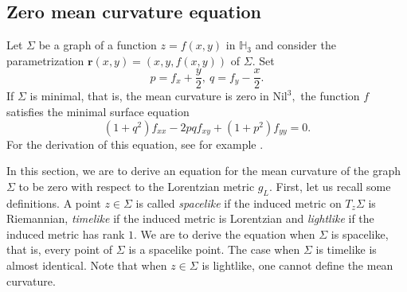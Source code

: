 \documentclass[11pt]{amsart}
\begin{document}
\subsection{Zero mean curvature equation}
Let $\Sigma$ be a graph of a function
 $z=f(x,y)$ in ${\mathbb{H}}_3$ and consider
 the
parametrization ${\mathbf{r}}(x,y)=(x,y,f(x,y))$ of $\Sigma.$ Set
\[
p=f_x+\frac{y}2,\ q=f_y-\frac{x}2.
\]
If $\Sigma$ is minimal, that is, the mean curvature is zero in
$\text{Nil}^3,$
 the function $f$ satisfies the minimal surface equation
 $$ (1+q^2)f_{xx}-2pqf_{xy}+(1+p^2)f_{yy}=0.$$
For the derivation of this equation, see for example \cite{IKOS}.

In this section, we are to derive an equation for the mean
curvature of the graph $\Sigma$ to be zero with respect to the
Lorentzian metric $g_L.$ First, let us recall some definitions. A
point $z\in \Sigma$ is called {\it spacelike} if the induced
metric on $T_z\Sigma$ is Riemannian, {\it timelike} if the induced
metric is Lorentzian and {\it lightlike} if the induced metric has
rank $1.$ We are to derive the equation when $\Sigma$ is
spacelike, that is, every point of $\Sigma$ is a spacelike point.
The case when $\Sigma$ is timelike is almost identical. Note that
when $z\in \Sigma$ is lightlike, one cannot define the mean
curvature.
\end{document}
